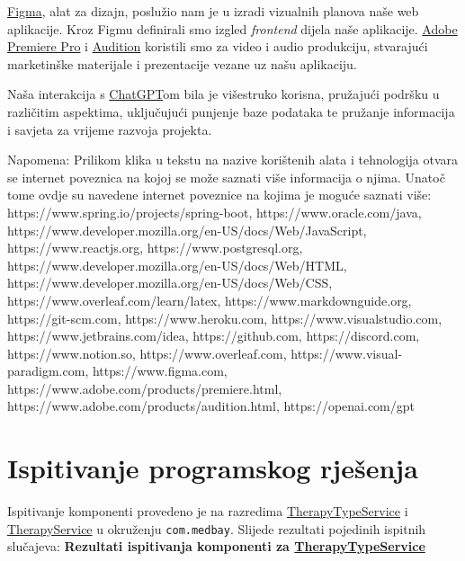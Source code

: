 \href{https://www.figma.com}{Figma}, alat za dizajn, poslužio nam je u izradi vizualnih planova naše web aplikacije. Kroz Figmu definirali smo izgled \textit{frontend} dijela naše aplikacije. \href{https://www.adobe.com/products/premiere.html}{Adobe Premiere Pro} i \href{https://www.adobe.com/products/audition.html}{Audition} koristili smo za video i audio produkciju, stvarajući marketinške materijale i prezentacije vezane uz našu aplikaciju.

Naša interakcija s \href{https://openai.com/gpt}{ChatGPT}om bila je višestruko korisna, pružajući podršku u različitim aspektima, uključujući punjenje baze podataka te pružanje informacija i savjeta za vrijeme razvoja projekta. 


 		Napomena: Prilikom klika u tekstu na nazive korištenih alata i tehnologija otvara se internet poveznica na kojoj se može saznati više informacija o njima. Unatoč tome ovdje su navedene internet poveznice na kojima je moguće saznati više:  https://www.spring.io/projects/spring-boot, https://www.oracle.com/java,  https://www.developer.mozilla.org/en-US/docs/Web/JavaScript, https://www.reactjs.org, https://www.postgresql.org, https://www.developer.mozilla.org/en-US/docs/Web/HTML, https://www.developer.mozilla.org/en-US/docs/Web/CSS, https://www.overleaf.com/learn/latex,  https://www.markdownguide.org, https://git-scm.com, https://www.heroku.com, https://www.visualstudio.com, https://www.jetbrains.com/idea, https://github.com, https://discord.com, https://www.notion.so, https://www.overleaf.com, https://www.visual-paradigm.com, https://www.figma.com, https://www.adobe.com/products/premiere.html, https://www.adobe.com/products/audition.html, https://openai.com/gpt
			\eject 
		
	
			\section{Ispitivanje programskog rješenja}
			
			Ispitivanje komponenti provedeno je na razredima  \href{https://github.com/Project-MedBay/backend/blob/main/src/test/java/com/medbay/TherapyTypeServiceTest.java}{TherapyTypeService} 
			i \href{https://github.com/Project-MedBay/backend/blob/main/src/test/java/com/medbay/TherapyServiceTest.java}{TherapyService} u okruženju \texttt{com.medbay}. Slijede rezultati pojedinih ispitnih slučajeva:
			\newline \textbf{Rezultati ispitivanja komponenti za \href{https://github.com/Project-MedBay/backend/blob/main/src/test/java/com/medbay/TherapyTypeServiceTest.java}{TherapyTypeService}}

